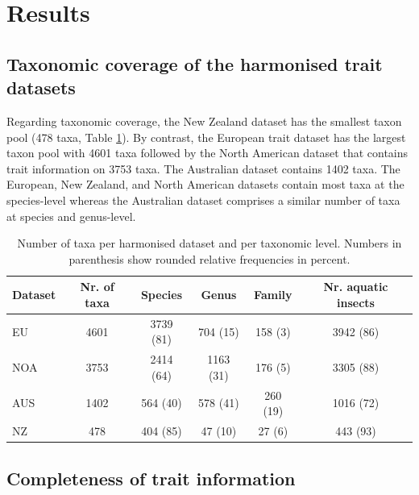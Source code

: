 \documentclass{article}
\begin{document}

\section*{Results}

\subsection*{Taxonomic coverage of the harmonised trait datasets}

Regarding taxonomic coverage, the New Zealand dataset has the smallest taxon pool (478 taxa, Table \ref{tab:tax_coverage}). By contrast, the European trait dataset has the largest taxon pool with 4601 taxa followed by the North American dataset that contains trait information on 3753 taxa. The Australian dataset contains 1402 taxa. The European, New Zealand, and North American datasets contain most taxa at the species-level whereas the Australian dataset comprises a similar number of taxa at species and genus-level.

\begin{table}[ht]
    \centering
    \caption{Number of taxa per harmonised dataset and per taxonomic level. Numbers in parenthesis show rounded relative frequencies in percent.} 
    \label{tab:tax_coverage}
    \begin{tabular}{lccccc}
    \toprule[.1em]
    Dataset & Nr. of taxa & Species & Genus & Family & Nr. aquatic insects \\ 
    \toprule[.1em]
    EU & 4601 & 3739 (81) & 704 (15) & 158 (3) & 3942 (86) \\ 
    NOA & 3753 & 2414 (64) & 1163 (31) & 176 (5) & 3305 (88) \\ 
    AUS & 1402 & 564 (40) & 578 (41) & 260 (19) & 1016 (72) \\ 
    NZ & 478 & 404 (85) & 47 (10) & 27 (6) & 443 (93) \\ 
    \bottomrule
    \end{tabular}
\end{table}


\subsection*{Completeness of trait information}
\end{document}
